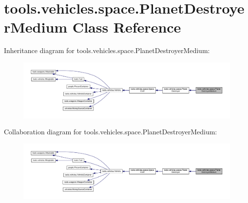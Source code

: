 \hypertarget{classtools_1_1vehicles_1_1space_1_1_planet_destroyer_medium}{}\section{tools.\+vehicles.\+space.\+Planet\+Destroyer\+Medium Class Reference}
\label{classtools_1_1vehicles_1_1space_1_1_planet_destroyer_medium}


Inheritance diagram for tools.\+vehicles.\+space.\+Planet\+Destroyer\+Medium\+:
\nopagebreak
\begin{figure}[H]
\begin{center}
\leavevmode
\includegraphics[width=350pt]{classtools_1_1vehicles_1_1space_1_1_planet_destroyer_medium__inherit__graph}
\end{center}
\end{figure}


Collaboration diagram for tools.\+vehicles.\+space.\+Planet\+Destroyer\+Medium\+:
\nopagebreak
\begin{figure}[H]
\begin{center}
\leavevmode
\includegraphics[width=350pt]{classtools_1_1vehicles_1_1space_1_1_planet_destroyer_medium__coll__graph}
\end{center}
\end{figure}
